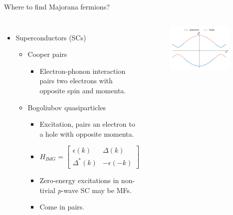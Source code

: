 \documentclass[xcolor=dvipsnames,10pt,aspectratio=169]{beamer}
\newcommand{\de}{\Delta}
\begin{document}
  \begin{frame}{Where to find Majorana fermions?}
    \begin{columns}
      \begin{itemize}
        \item Superconductors (SCs)
          \begin{itemize}
            \item Cooper pairs
            \begin{itemize}
              \item Electron-phonon interaction pairs two electrons with opposite spin and momenta.
            \end{itemize}
            \pause
            \item Bogoliubov quasiparticles
            \begin{itemize}
              \item Excitation, pairs an electron to a hole with opposite momenta.
              \item[] \[ H_{BdG} = \begin{bmatrix} \epsilon(k) & \de(k) \\ \de^\ast(k) & -\epsilon(-k) \end{bmatrix} \]
              \item Zero-energy excitations in non-tivial \textit{p}-wave SC may be MFs.
              \item Come in pairs.
            \end{itemize}
          \end{itemize}
      \end{itemize}

      \begin{figure}
        \includegraphics[width=0.90\textwidth]{./figures/p-wave-mu-p1_25.pdf}
      \end{figure}

    \end{columns}

  \end{frame}
\end{document}

